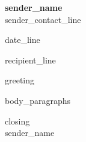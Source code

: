 \documentclass[11pt,a4paper]{article}
\begin{document}
\begin{flushright}
  \textbf{{{sender_name}}}\\
  {\small {{sender_contact_line}}}
\end{flushright}

\vspace{4pt}

{{date_line}}

\vspace{6pt}

{{recipient_line}}

\vspace{6pt}

{{greeting}}

{{body_paragraphs}}

{{closing}}\\[24pt]
{{sender_name}}
\end{document}
